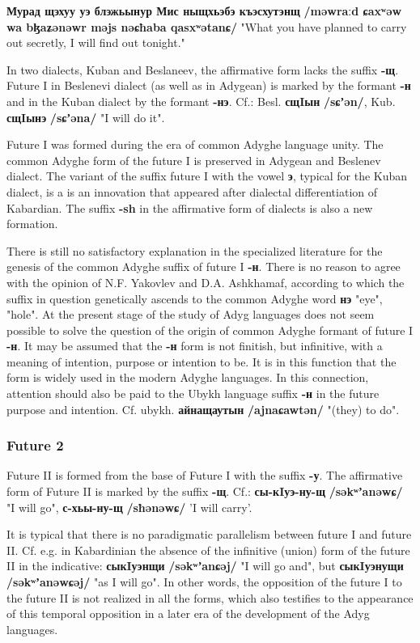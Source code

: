 \documentclass[a4paper,12pt]{book}
\newcommand{\1}[1]{\textbf{\emph{#1}}} %
\newcommand{\2}[1]{\textbf{[#1]}} %
\newcommand{\3}[1]{\fontsize{11pt}{0cm}\textbf{\emph{#1}}} %
\newcommand{\4}[1]{\fontsize{10pt}{0cm}\emph{#1}}	%
\newcommand{\5}[1]{\textbf{/#1/}} %
\newcommand{\6}[1]{\textbf{[#1]}} %
\newcommand{\7}[1]{\fontsize{12pt}{0cm}\emph{#1}} %
\newcommand{\8}[1]{\fontsize{12pt}{0cm}`#1'} %
\newcommand{\9}[1]{\fontsize{12pt}{0cm}(lit. `#1')} %
\newcommand{\glossphonemics}[1]{\textbf{/#1/}} %
\begin{document}
\textbf{Мурад щэхуу уэ блэжьынур Мис ныщхьэбэ къэсхутэнщ} \glossphonemics{məwraːd ɕaxʷəw wa bɮaʑənəwr məjs nəɕħaba qasxʷətanɕ} "What you have planned to carry out secretly, I will find out tonight."

In two dialects, Kuban and Beslaneev, the affirmative form lacks the suffix \textbf{-щ}. Future I in Beslenevi dialect (as well as in Adygean) is marked by the formant \textbf{-н} and in the Kuban dialect by the formant \textbf{-нэ}. Cf.: Besl. \textbf{сщIын} \glossphonemics{sɕʼən}, Kub. \textbf{сщIынэ} \glossphonemics{sɕʼəna} "I will do it".

Future I was formed during the era of common Adyghe language unity. The common Adyghe form of the future I is preserved in Adygean and Beslenev dialect. The variant of the suffix future I with the vowel \textbf{э}, typical for the Kuban dialect, is a is an innovation that appeared after dialectal differentiation of Kabardian. The suffix \textbf{-sh} in the affirmative form of dialects is also a new formation.

There is still no satisfactory explanation in the specialized literature for the genesis of the common Adyghe suffix of future I \textbf{-н}. There is no reason to agree with the opinion of N.F. Yakovlev and D.A. Ashkhamaf, according to which the suffix in question genetically ascends to the common Adyghe word \textbf{нэ} "eye", "hole". At the present stage of the study of Adyg languages does not seem possible to solve the question of the origin of common Adyghe formant of future I \textbf{-н}. It may be assumed that the \textbf{-н} form is not finitish, but infinitive, with a meaning of intention, purpose or intention to be. It is in this function that the form is widely used in the modern Adyghe languages. In this connection, attention should also be paid to the Ubykh language suffix \textbf{-н} in the future purpose and intention. Cf. ubykh. \textbf{айнащаутын} \glossphonemics{ajnaɕawtən} "(they) to do".
\subsubsection{Future 2}
Future II is formed from the base of Future I with the suffix \textbf{-у}. The affirmative form of Future II is marked by the suffix \textbf{-щ}. Cf.: \textbf{сы-кIуэ-ну-щ} \glossphonemics{səkʷʼanəwɕ} "I will go", \textbf{с-хьы-ну-щ} \glossphonemics{sħənəwɕ} 'I will carry'.

It is typical that there is no paradigmatic parallelism between future I and future II. Cf. e.g. in Kabardinian the absence of the infinitive (union) form of the future II in the indicative: \textbf{сыкIуэнщи} \glossphonemics{səkʷʼanɕəj} "I will go and", but \textbf{сыкIуэнущи} \glossphonemics{səkʷʼanəwɕəj} "as I will go". In other words, the opposition of the future I to the future II is not realized in all the forms, which also testifies to the appearance of this temporal opposition in a later era of the development of the Adyg languages.
\end{document}
